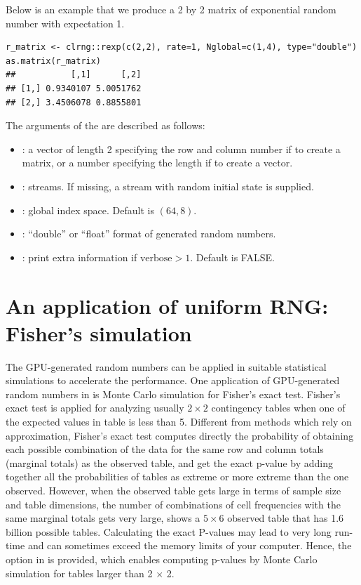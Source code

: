 \documentclass[article,nojss]{jss}\usepackage[]{graphicx}\usepackage[]{color}
\makeatletter
\newenvironment{kframe}{%
 \def\at@end@of@kframe{}%
 \ifinner\ifhmode%
  \def\at@end@of@kframe{\end{minipage}}%
  \begin{minipage}{\columnwidth}%
 \fi\fi%
 \def\FrameCommand##1{\hskip\@totalleftmargin \hskip-\fboxsep
 \colorbox{shadecolor}{##1}\hskip-\fboxsep
     \hskip-\linewidth \hskip-\@totalleftmargin \hskip\columnwidth}%
 \MakeFramed {\advance\hsize-\width
   \@totalleftmargin\z@ \linewidth\hsize
   \@setminipage}}%
 {\par\unskip\endMakeFramed%
 \at@end@of@kframe}
\newenvironment{knitrout}{}{} %
\newcommand{\fct}[1]{\code{#1()}}
\makeatother
\begin{document}
Below is an example that we produce a 2 by 2 matrix of exponential random number with expectation 1.
\begin{knitrout}
\color{fgcolor}\begin{kframe}
\begin{verbatim}
r_matrix <- clrng::rexp(c(2,2), rate=1, Nglobal=c(1,4), type="double")
as.matrix(r_matrix)
##           [,1]      [,2]
## [1,] 0.9340107 5.0051762
## [2,] 3.4506078 0.8855801
\end{verbatim}
\end{kframe}
\end{knitrout}
The arguments of the \fct{clrng::rexp} are described as follows:
\begin{itemize}
\itemsep0em 
  \item {}: a vector of length 2 specifying the row and column number if to create a matrix, or a number specifying the length if to create a vector.
  \item {}: streams. If missing, a stream with random initial state is supplied.
  \item {}: global index space. Default is $(64,8)$.
  \item {}: ``double'' or ``float'' format of generated random numbers.
  \item {}: print extra information if $\text{verbose} > 1$. Default is FALSE.
\end{itemize}





\section{An application of uniform RNG: Fisher's simulation}
The GPU-generated random numbers can be applied in suitable statistical simulations to accelerate the performance.
One application of GPU-generated random numbers in  is Monte Carlo simulation for Fisher's exact test. Fisher’s exact test is applied for analyzing usually $2 \times 2$ contingency tables when one of the expected values in table is less than 5. Different from methods which rely on approximation, Fisher's exact test computes directly the probability of obtaining each possible combination of the data for the same row and column totals (marginal totals) as the observed table, and get the exact p-value by adding together all the probabilities of tables as extreme or more extreme than the one observed. However, when the observed table gets large in terms of sample size and table dimensions, the number of combinations of cell frequencies with the same marginal totals gets very large, \cite[][p. 23]{mehta2011ibm} shows a $5 \times 6$ observed table that has 1.6 billion possible tables. Calculating the exact P-values may lead to very long run-time and can sometimes exceed the memory limits of your computer. Hence, the option  in \fct{stats::fisher.test} is provided, which enables computing p-values by Monte Carlo simulation for tables larger than 2 $\times$ 2. 
\end{document}
